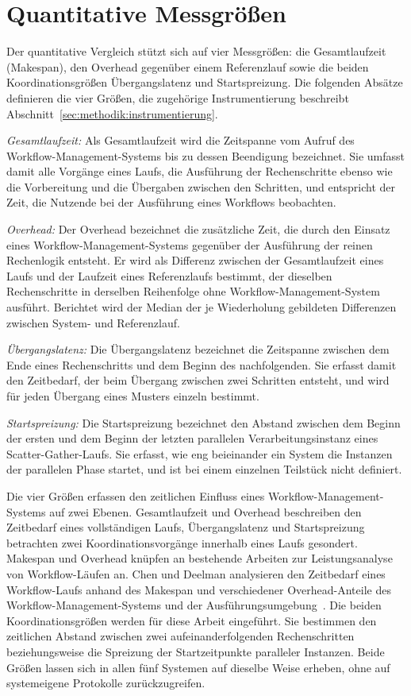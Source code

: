 \section{Quantitative Messgrößen}
\label{sec:methodik:messgroessen}
Der quantitative Vergleich stützt sich auf vier Messgrößen: die Gesamtlaufzeit (Makespan), den Overhead gegenüber einem Referenzlauf sowie die beiden Koordinationsgrößen Übergangslatenz und Startspreizung. Die folgenden Absätze definieren die vier
Größen, die zugehörige Instrumentierung beschreibt
Abschnitt~\ref{sec:methodik:instrumentierung}.

\emph{Gesamtlaufzeit:} Als Gesamtlaufzeit wird die Zeitspanne vom
Aufruf des Workflow-Management-Systems bis zu dessen Beendigung
bezeichnet. Sie umfasst damit alle Vorgänge eines Laufs, die
Ausführung der Rechenschritte ebenso wie die Vorbereitung und die
Übergaben zwischen den Schritten, und entspricht der Zeit, die
Nutzende bei der Ausführung eines Workflows beobachten.

\emph{Overhead:} Der Overhead bezeichnet die zusätzliche Zeit, die durch den Einsatz eines Workflow-Management-Systems gegenüber der Ausführung der reinen Rechenlogik entsteht. Er wird als Differenz zwischen der Gesamtlaufzeit eines Laufs und der Laufzeit eines Referenzlaufs bestimmt, der dieselben Rechenschritte in derselben Reihenfolge ohne Workflow-Management-System ausführt. Berichtet wird der Median der je Wiederholung gebildeten
Differenzen zwischen System- und Referenzlauf.

\emph{Übergangslatenz:} Die Übergangslatenz bezeichnet die
Zeitspanne zwischen dem Ende eines Rechenschritts und dem Beginn des
nachfolgenden. Sie erfasst damit den Zeitbedarf, der beim Übergang
zwischen zwei Schritten entsteht, und wird für jeden Übergang eines
Musters einzeln bestimmt.

\emph{Startspreizung:} Die Startspreizung bezeichnet den Abstand
zwischen dem Beginn der ersten und dem Beginn der letzten parallelen
Verarbeitungsinstanz eines Scatter-Gather-Laufs. Sie erfasst, wie
eng beieinander ein System die Instanzen der parallelen Phase startet,
und ist bei einem einzelnen Teilstück nicht definiert.

Die vier Größen erfassen den zeitlichen Einfluss eines
Workflow-Management-Systems auf zwei Ebenen. Gesamtlaufzeit und
Overhead beschreiben den Zeitbedarf eines vollständigen Laufs,
Übergangslatenz und Startspreizung betrachten zwei
Koordinationsvorgänge innerhalb eines Laufs gesondert. Makespan und
Overhead knüpfen an bestehende Arbeiten zur Leistungsanalyse von
Workflow-Läufen an. Chen und Deelman analysieren den Zeitbedarf
eines Workflow-Laufs anhand des Makespan und verschiedener
Overhead-Anteile des Workflow-Management-Systems und der
Ausführungsumgebung~\cite{chen2011overhead}. Die beiden
Koordinationsgrößen werden für diese Arbeit eingeführt. Sie bestimmen den zeitlichen Abstand zwischen zwei aufeinanderfolgenden
Rechenschritten beziehungsweise die Spreizung der Startzeitpunkte
paralleler Instanzen. Beide Größen lassen sich in allen fünf
Systemen auf dieselbe Weise erheben, ohne auf systemeigene
Protokolle zurückzugreifen.

